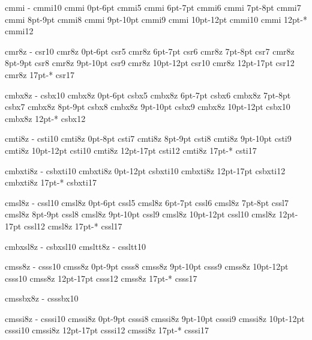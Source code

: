 \registertfm cmmi    -      cmmi10
\registertfm cmmi 0pt-6pt   cmmi5
\registertfm cmmi 6pt-7pt   cmmi6
\registertfm cmmi 7pt-8pt   cmmi7
\registertfm cmmi 8pt-9pt   cmmi8
\registertfm cmmi 9pt-10pt  cmmi9
\registertfm cmmi 10pt-12pt cmmi10
\registertfm cmmi 12pt-*    cmmi12


\registertfm cmr8z     -      csr10
\registertfm cmr8z  0pt-6pt   csr5
\registertfm cmr8z  6pt-7pt   csr6
\registertfm cmr8z  7pt-8pt   csr7
\registertfm cmr8z  8pt-9pt   csr8
\registertfm cmr8z  9pt-10pt  csr9
\registertfm cmr8z  10pt-12pt csr10
\registertfm cmr8z  12pt-17pt csr12
\registertfm cmr8z  17pt-*    csr17

\registertfm cmbx8z    -      csbx10
\registertfm cmbx8z 0pt-6pt   csbx5
\registertfm cmbx8z 6pt-7pt   csbx6
\registertfm cmbx8z 7pt-8pt   csbx7
\registertfm cmbx8z 8pt-9pt   csbx8
\registertfm cmbx8z 9pt-10pt  csbx9
\registertfm cmbx8z 10pt-12pt csbx10
\registertfm cmbx8z 12pt-*    csbx12

\registertfm cmti8z    -      csti10
\registertfm cmti8z 0pt-8pt   csti7
\registertfm cmti8z 8pt-9pt   csti8
\registertfm cmti8z 9pt-10pt  csti9
\registertfm cmti8z 10pt-12pt csti10
\registertfm cmti8z 12pt-17pt csti12
\registertfm cmti8z 17pt-*    csti17

\registertfm cmbxti8z    -      csbxti10
\registertfm cmbxti8z 0pt-12pt  csbxti10
\registertfm cmbxti8z 12pt-17pt csbxti12
\registertfm cmbxti8z 17pt-*    csbxti17

\registertfm cmsl8z     -      cssl10
\registertfm cmsl8z  0pt-6pt   cssl5
\registertfm cmsl8z  6pt-7pt   cssl6
\registertfm cmsl8z  7pt-8pt   cssl7
\registertfm cmsl8z  8pt-9pt   cssl8
\registertfm cmsl8z  9pt-10pt  cssl9
\registertfm cmsl8z  10pt-12pt cssl10
\registertfm cmsl8z  12pt-17pt cssl12
\registertfm cmsl8z  17pt-*    cssl17

\registertfm cmbxsl8z  -      csbxsl10
\registertfm cmsltt8z  -      cssltt10

\registertfm cmss8z    -      csss10
\registertfm cmss8z 0pt-9pt   csss8
\registertfm cmss8z 9pt-10pt  csss9
\registertfm cmss8z 10pt-12pt csss10
\registertfm cmss8z 12pt-17pt csss12
\registertfm cmss8z 17pt-*    csss17

\registertfm cmssbx8z   -      csssbx10

\registertfm cmssi8z    -      csssi10
\registertfm cmssi8z 0pt-9pt   csssi8
\registertfm cmssi8z 9pt-10pt  csssi9
\registertfm cmssi8z 10pt-12pt csssi10
\registertfm cmssi8z 12pt-17pt csssi12
\registertfm cmssi8z 17pt-*    csssi17

